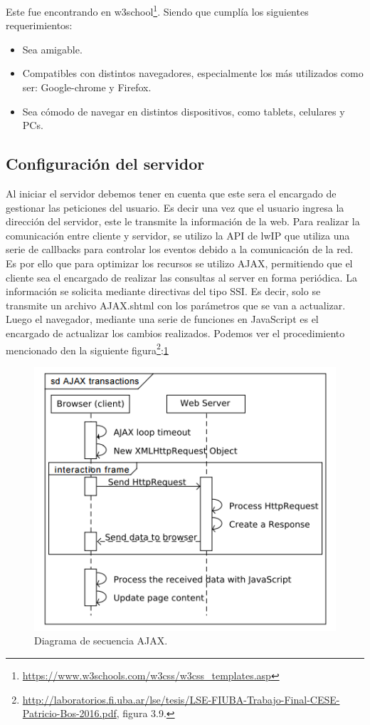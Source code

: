 Este fue encontrando en w3school\footnote{\url{https://www.w3schools.com/w3css/w3css_templates.asp}}. Siendo que cumplía los siguientes requerimientos:
\begin{itemize}
  \item Sea amigable.
  \item Compatibles con distintos navegadores, especialmente los más utilizados como ser: Google-chrome y Firefox. 
  \item Sea cómodo de navegar en distintos dispositivos, como tablets, celulares y PCs.
\end{itemize}


\subsection*{Configuración del servidor}
Al iniciar el servidor debemos tener en cuenta que este sera el encargado de gestionar las peticiones del usuario. Es decir una vez que el usuario ingresa la dirección del servidor, este le transmite la información de la web.  Para realizar la comunicación entre cliente y servidor, se utilizo la API de lwIP  que utiliza una serie de callbacks para controlar los eventos debido a la comunicación de la red. Es por ello que para optimizar los recursos se utilizo AJAX, permitiendo que el cliente sea el encargado de realizar las consultas al server en forma periódica. La información se solicita mediante directivas del tipo SSI. Es decir, solo se transmite un archivo AJAX.shtml con los parámetros que se van a actualizar. Luego el navegador, mediante una serie de funciones en JavaScript es el encargado de actualizar los cambios realizados.  
Podemos ver el procedimiento mencionado den la siguiente figura\footnote{\url{http://laboratorios.fi.uba.ar/lse/tesis/LSE-FIUBA-Trabajo-Final-CESE-Patricio-Bos-2016.pdf}, figura 3.9.}:\ref{fig:ajax_sec} 
\begin{figure}[!htb]
    \centering
    \includegraphics[scale=.8]{./Figures/ajax_sec.png}
    \caption{Diagrama de secuencia AJAX.}
    \label{fig:ajax_sec}
\end{figure}


